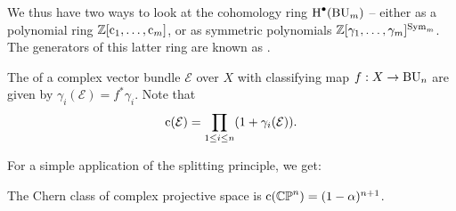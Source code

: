 We thus have two ways to look at the cohomology ring $\operatorname{H}^\bullet(\mathrm{BU}_m)$ -- either as a polynomial ring $\mathbb{Z}[\mathrm{c}_1,\ldots, \mathrm{c}_m]$, or as symmetric polynomials $\mathbb{Z}[\gamma_1,\ldots, \gamma_m]^{\mathrm{Sym}_m}$. The generators of this latter ring are known as .

\begin{definition}\label{def:chern-roots}
	The  of a complex vector bundle $\mathcal{E}$ over $X$ with classifying map $f : X \to \mathrm{BU}_n$ are given by $\gamma_i(\mathcal{E}) = f^*\gamma_i$. Note that
	\[ \mathrm{c}(\mathcal{E}) = \prod_{1\leq i \leq n} (1+\gamma_i(\mathcal{E})). \]
\end{definition}

For a simple application of the splitting principle, we get:
\begin{corollary}
	The Chern class of complex projective space is $\mathrm{c}(\mathbb{CP}^n)=(1-\alpha)^{n+1}$.
\end{corollary}

